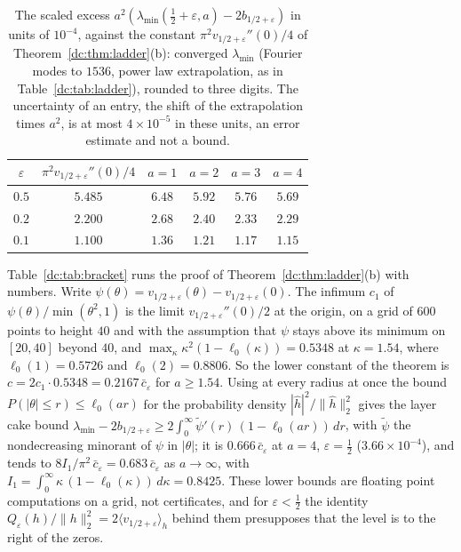\begin{table}[ht]
\centering\small
\begin{tabular}{@{}cccccc@{}}
\toprule
$\varepsilon$ & $\pi^2v_{1/2+\varepsilon}''(0)/4$ & $a=1$ & $a=2$ & $a=3$ & $a=4$\\
\midrule
$0.5$ & $5.485$ & $6.48$ & $5.92$ & $5.76$ & $5.69$\\
$0.2$ & $2.200$ & $2.68$ & $2.40$ & $2.33$ & $2.29$\\
$0.1$ & $1.100$ & $1.36$ & $1.21$ & $1.17$ & $1.15$\\
\bottomrule
\end{tabular}
\caption{The scaled excess $a^2(\lambda_{\min}(\frac12+\varepsilon,a)-2b_{1/2+\varepsilon})$ in units of $10^{-4}$, against the constant $\pi^2v_{1/2+\varepsilon}''(0)/4$ of Theorem~\ref{dc:thm:ladder}(b): converged $\lambda_{\min}$ (Fourier modes to $1536$, power law extrapolation, as in Table~\ref{dc:tab:ladder}), rounded to three digits. The uncertainty of an entry, the shift of the extrapolation times $a^2$, is at most $4\times10^{-5}$ in these units, an error estimate and not a bound.}
\label{dc:tab:rate}
\end{table}

Table~\ref{dc:tab:bracket} runs the proof of Theorem~\ref{dc:thm:ladder}(b) with numbers. Write $\psi(\theta)=v_{1/2+\varepsilon}(\theta)-v_{1/2+\varepsilon}(0)$. The infimum $c_1$ of $\psi(\theta)/\min(\theta^2,1)$ is the limit $v_{1/2+\varepsilon}''(0)/2$ at the origin, on a grid of $600$ points to height $40$ and with the assumption that $\psi$ stays above its minimum on $[20,40]$ beyond $40$, and $\max_\kappa\kappa^2(1-\ell_0(\kappa))=0.5348$ at $\kappa=1.54$, where $\ell_0(1)=0.5726$ and $\ell_0(2)=0.8806$. So the lower constant of the theorem is $c=2c_1\cdot0.5348=0.2167\,\bar c_\varepsilon$ for $a\ge1.54$. Using at every radius at once the bound $P(|\theta|\le r)\le\ell_0(ar)$ for the probability density $|\hat h|^2/\|\hat h\|_2^2$ gives the layer cake bound $\lambda_{\min}-2b_{1/2+\varepsilon}\ge2\int_0^\infty\tilde\psi'(r)\,(1-\ell_0(ar))\,dr$, with $\tilde\psi$ the nondecreasing minorant of $\psi$ in $|\theta|$; it is $0.666\,\bar c_\varepsilon$ at $a=4$, $\varepsilon=\frac12$ ($3.66\times10^{-4}$), and tends to $8I_1/\pi^2\,\bar c_\varepsilon=0.683\,\bar c_\varepsilon$ as $a\to\infty$, with $I_1=\int_0^\infty\kappa\,(1-\ell_0(\kappa))\,d\kappa=0.8425$. These lower bounds are floating point computations on a grid, not certificates, and for $\varepsilon<\frac12$ the identity $Q_\varepsilon(h)/\|h\|_2^2=2\langle v_{1/2+\varepsilon}\rangle_h$ behind them presupposes that the level is to the right of the zeros.

